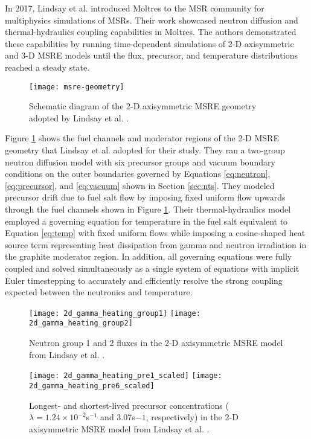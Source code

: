 In 2017, Lindsay et al. introduced
Moltres to the \gls{MSR} community for multiphysics simulations of \glspl{MSR}.
Their work showcased neutron diffusion and thermal-hydraulics coupling
capabilities in Moltres. The authors
demonstrated these capabilities by running time-dependent simulations of 2-D
axisymmetric and 3-D \gls{MSRE} models until the flux, precursor, and
temperature distributions reached a steady state.

\begin{figure}[htb!]
	\centering
	\texttt{[image: msre-geometry]}
	\caption{Schematic diagram of the 2-D axisymmetric \gls{MSRE} geometry
	adopted by Lindsay et al. \cite{lindsay_introduction_2018}.}
	\label{fig:msre-geometry}
\end{figure}

Figure \ref{fig:msre-geometry} shows the fuel channels and moderator regions of
the 2-D \gls{MSRE} geometry that Lindsay et al. adopted for their study.
They ran a two-group neutron diffusion model with six precursor groups and
vacuum boundary conditions on the outer boundaries governed by Equations
\ref{eq:neutron}, \ref{eq:precursor}, and \ref{eq:vacuum} shown in Section
\ref{sec:nts}. They modeled precursor drift due to fuel salt flow by imposing
fixed uniform flow upwards through the fuel channels shown in Figure
\ref{fig:msre-geometry}. Their thermal-hydraulics model employed a
governing equation for temperature in the fuel salt equivalent to Equation
\ref{eq:temp} with fixed uniform flows while imposing a cosine-shaped heat
source term representing heat dissipation from gamma and neutron irradiation in
the graphite moderator region. In addition, all governing equations were fully
coupled and solved simultaneously as a single system of equations with implicit
Euler timestepping to accurately and efficiently resolve the strong coupling
expected between the neutronics and temperature.

\begin{figure}[htb!]
	\centering
	\texttt{[image: 2d\_gamma\_heating\_group1]}
	\texttt{[image: 2d\_gamma\_heating\_group2]}
	\caption{Neutron group 1 and 2 fluxes in the 2-D axisymmetric \gls{MSRE}
	model from Lindsay et al. \cite{lindsay_introduction_2018}.}
	\label{fig:msre-flux}
\end{figure}

\begin{figure}[htb!]
	\centering
	\texttt{[image: 2d\_gamma\_heating\_pre1\_scaled]}
	\texttt{[image: 2d\_gamma\_heating\_pre6\_scaled]}
	\caption{Longest- and shortest-lived precursor concentrations ($\lambda =
	1.24\times 10^{-2}$s$^{-1}$ and $3.07$s${-1}$, respectively) in the 2-D
	axisymmetric \gls{MSRE} model from Lindsay et al.
	\cite{lindsay_introduction_2018}.}
	\label{fig:msre-precursor}
\end{figure}

